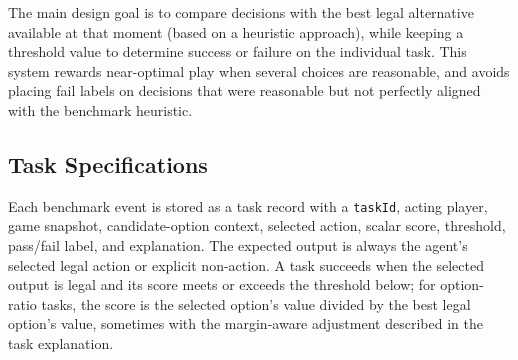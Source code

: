 \documentclass{article}
\begin{document}
The main design goal is to compare decisions with the best legal alternative available at that moment (based on a heuristic approach), while keeping a threshold value to determine success or failure on the individual task.  
This system rewards near-optimal play when several choices are reasonable, and avoids placing fail labels on decisions that were reasonable but not perfectly aligned with the benchmark heuristic. 

\subsection{Task Specifications}
\label{app:task-specifications}

Each benchmark event is stored as a task record with a \texttt{taskId}, acting player, game snapshot, candidate-option context, selected action, scalar score, threshold, pass/fail label, and explanation. The expected output is always the agent's selected legal action or explicit non-action. A task succeeds when the selected output is legal and its score meets or exceeds the threshold below; for option-ratio tasks, the score is the selected option's value divided by the best legal option's value, sometimes with the margin-aware adjustment described in the task explanation.
\end{document}
